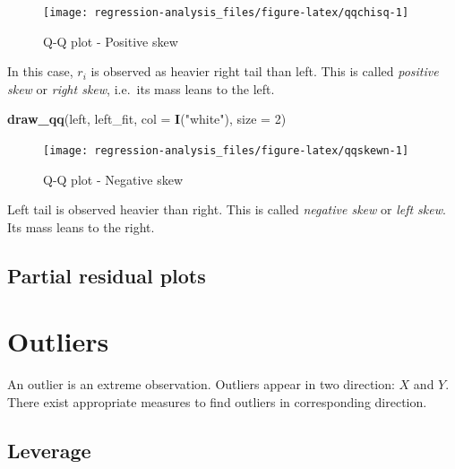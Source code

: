 \documentclass[]{book}
\newenvironment{Shaded}{\begin{snugshade}}{\end{snugshade}}
\newcommand{\DataTypeTok}[1]{\textcolor[rgb]{0.13,0.29,0.53}{#1}}
\newcommand{\DecValTok}[1]{\textcolor[rgb]{0.00,0.00,0.81}{#1}}
\newcommand{\KeywordTok}[1]{\textcolor[rgb]{0.13,0.29,0.53}{\textbf{#1}}}
\newcommand{\NormalTok}[1]{#1}
\newcommand{\StringTok}[1]{\textcolor[rgb]{0.31,0.60,0.02}{#1}}
\theoremstyle{definition}
\theoremstyle{definition}
\theoremstyle{definition}
\theoremstyle{remark}
\begin{document}
\begin{figure}[H]

{\centering \texttt{[image: regression-analysis\_files/figure-latex/qqchisq-1]} 

}

\caption{Q-Q plot - Positive skew}\label{fig:qqchisq}
\end{figure}

In this case, \(r_i\) is observed as heavier right tail than left. This is called \emph{positive skew} or \emph{right skew}, i.e.~its mass leans to the left.

\begin{Shaded}
\begin{Highlighting}[]
\KeywordTok{draw_qq}\NormalTok{(left, left_fit, }\DataTypeTok{col =} \KeywordTok{I}\NormalTok{(}\StringTok{"white"}\NormalTok{), }\DataTypeTok{size =} \DecValTok{2}\NormalTok{)}
\end{Highlighting}
\end{Shaded}

\begin{figure}[H]

{\centering \texttt{[image: regression-analysis\_files/figure-latex/qqskewn-1]} 

}

\caption{Q-Q plot - Negative skew}\label{fig:qqskewn}
\end{figure}

Left tail is observed heavier than right. This is called \emph{negative skew} or \emph{left skew}. Its mass leans to the right.

\hypertarget{partial-residual-plots}{%
\subsection{Partial residual plots}\label{partial-residual-plots}}

\hypertarget{outliers}{%
\section{Outliers}\label{outliers}}

An outlier is an extreme observation. Outliers appear in two direction: \(X\) and \(Y\). There exist appropriate measures to find outliers in corresponding direction.

\hypertarget{leverage}{%
\subsection{Leverage}\label{leverage}}
\end{document}

